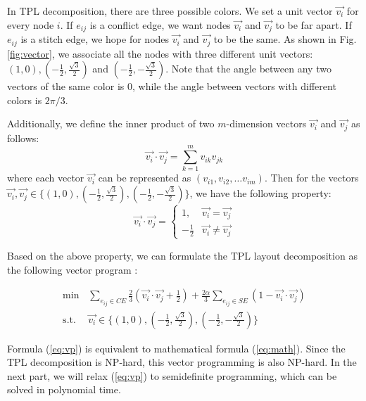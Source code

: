 \documentclass[10pt,conference]{IEEEtran}
\begin{document}
In TPL decomposition, there are three possible colors.
We set a unit vector $\vec{v_i}$ for every node $i$.
If $e_{ij}$ is a conflict edge, we want nodes $\vec{v_i}$ and $\vec{v_j}$ to be far apart.
If $e_{ij}$ is a stitch edge, we hope for nodes $\vec{v_i}$ and $\vec{v_j}$ to be the same.
As shown in Fig. \ref{fig:vector}, we associate all the nodes with three different unit vectors: $(1, 0), (-\frac{1}{2}, \frac{\sqrt{3}}{2})$ and $(-\frac{1}{2}, -\frac{\sqrt{3}}{2})$.
Note that the angle between any two vectors of the same color is $0$, while the angle between vectors with different colors is $2\pi/3$.

Additionally, we define the inner product of two $m$-dimension vectors $\vec{v_i}$ and $\vec{v_j}$ as follows:
\begin{displaymath}
	\vec{v_i} \cdot \vec{v_j} = \sum_{k=1}^{m} v_{ik}v_{jk}
\end{displaymath}
where each vector $\vec{v_i}$ can be represented as $(v_{i1}, v_{i2}, \dots v_{im})$.
Then for the vectors $\vec{v_i}, \vec{v_j} \in \{(1, 0), (-\frac{1}{2}, \frac{\sqrt{3}}{2}), (-\frac{1}{2}, -\frac{\sqrt{3}}{2})\}$, we have the following  property:
\begin{displaymath}
	\vec{v_i} \cdot \vec{v_j} = 
	\left\{
	\begin{array}{cc}
		1, 			& \vec{v_i} = \vec{v_j}\\
		-\frac{1}{2} 	& \vec{v_i} \ne \vec{v_j}
	\end{array}
	\right.
\end{displaymath}



Based on the above property, we can formulate the TPL layout decomposition as the following vector program \cite{approx_book2011}:

\begin{align}
    \label{eq:vp}
    \textrm{min}  & \sum_{e_{ij} \in CE} \frac{2}{3} ( \vec{v_i} \cdot \vec{v_j} + \frac{1}{2} ) + \frac{2\alpha}{3} \sum_{e_{ij} \in SE} ( 1 - \vec{v_i} \cdot \vec{v_j} ) \\
    \textrm{s.t}.\ \	& \vec{v_i} \in \{(1, 0), (-\frac{1}{2}, \frac{\sqrt{3}}{2}), (-\frac{1}{2}, -\frac{\sqrt{3}}{2})\} 	 \label{3a}\tag{$3a$}
\end{align}

Formula (\ref{eq:vp}) is equivalent to mathematical formula (\ref{eq:math}).
Since the TPL decomposition is NP-hard, this vector programming is also NP-hard.
In the next part, we will relax (\ref{eq:vp}) to semidefinite programming, which can be solved in polynomial time. 
\end{document}
